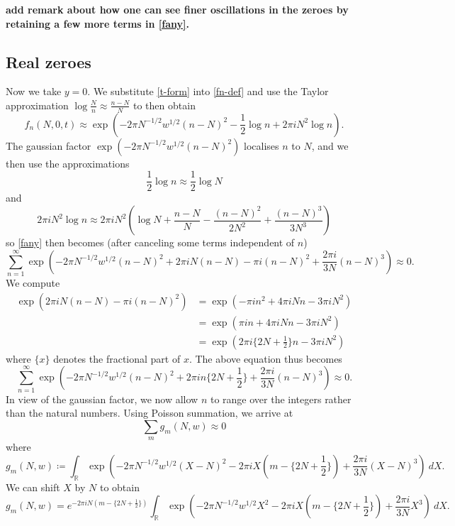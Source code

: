\documentclass[a4paper,11pt,twoside]{amsart}
\newcommand\R{\mathbb{R}}
\begin{document}
{\bf add remark about how one can see finer oscillations in the zeroes by retaining a few more terms in \eqref{fany}.}

\subsection{Real zeroes}

Now we take $y=0$. 
We substitute \eqref{t-form} into \eqref{fn-def} and use the Taylor approximation $\log \frac{N}{n} \approx \frac{n-N}{N}$ to then obtain
$$ f_n(N,0,t) \approx  \exp( -2\pi N^{-1/2} w^{1/2} (n-N)^2  - \frac{1}{2} \log n + 2\pi i N^2 \log n).$$
The gaussian factor $\exp( -2\pi N^{-1/2} w^{1/2} (n-N)^2 )$ localises $n$ to $N$, and we then use the approximations
$$ \frac{1}{2} \log n \approx \frac{1}{2} \log N$$
and
$$ 2\pi i N^2\log n \approx 2\pi i N^2 (\log N + \frac{n-N}{N} - \frac{(n-N)^2}{2N^2} + \frac{(n-N)^3}{3N^3})$$
so \eqref{fany} then becomes (after canceling some terms independent of $n$)
$$ \sum_{n=1}^\infty \exp( -2\pi N^{-1/2} w^{1/2} (n-N)^2  + 2\pi i N (n-N) - \pi i (n-N)^2 + \frac{2\pi i}{3N} (n-N)^3 ) \approx 0.$$
We compute
\begin{align*}
\exp( 2\pi i N(n-N) - \pi i (n-N)^2 ) &= \exp( -\pi i n^2 + 4\pi i N n - 3 \pi i N^2 ) \\
&= \exp( \pi i n + 4\pi i N n - 3 \pi i N^2 ) \\
&= \exp(2\pi i \{ 2N + \frac{1}{2} \} n - 3 \pi i N^2 )
\end{align*}
where $\{x\}$ denotes the fractional part of $x$.  The above equation thus becomes
$$
 \sum_{n=1}^\infty \exp( -2\pi N^{-1/2} w^{1/2} (n-N)^2 + 2\pi i n \{2N + \frac{1}{2}\} + \frac{2\pi i}{3N} (n-N)^3) \approx 0.$$
In view of the gaussian factor, we now allow $n$ to range over the integers rather than the natural numbers.  Using Poisson summation, we arrive at
$$ \sum_m g_m(N,w) \approx 0$$
where
$$g_m(N,w) \coloneqq \int_\R \exp( -2\pi N^{-1/2} w^{1/2} (X-N)^2 - 2\pi i X (m - \{2N + \frac{1}{2}\}) + \frac{2\pi i}{3N} (X-N)^3)\ dX.$$
We can shift $X$ by $N$ to obtain
$$ g_m(N,w) = e^{-2\pi i N (m - \{2N + \frac{1}{2}\})} \int_\R \exp( -2\pi N^{-1/2} w^{1/2} X^2- 2\pi i X (m - \{2N + \frac{1}{2}\}) + \frac{2\pi i}{3N} X^3)\ dX.$$
\end{document}
